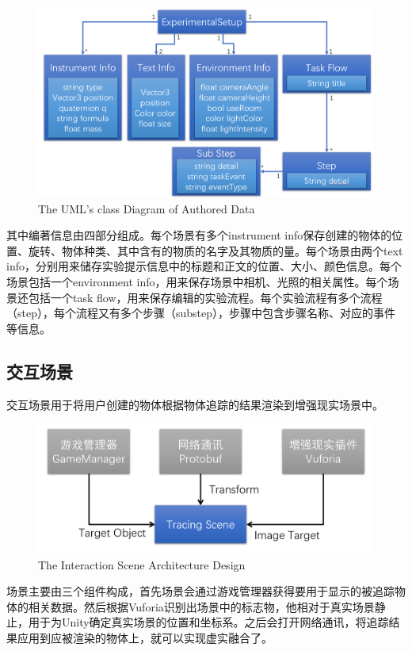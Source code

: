 \begin{figure}[!htp]
  \centering
  \includegraphics[width=12cm]{figure/setupclass.png}
    {The UML's class Diagram of Authored Data}
 \label{fig:uml}
\end{figure}

其中编著信息由四部分组成。每个场景有多个instrument info保存创建的物体的位置、旋转、物体种类、其中含有的物质的名字及其物质的量。每个场景由两个text info，分别用来储存实验提示信息中的标题和正文的位置、大小、颜色信息。每个场景包括一个environment info，用来保存场景中相机、光照的相关属性。每个场景还包括一个task flow，用来保存编辑的实验流程。每个实验流程有多个流程（step），每个流程又有多个步骤（substep），步骤中包含步骤名称、对应的事件等信息。

\subsection{交互场景}
交互场景用于将用户创建的物体根据物体追踪的结果渲染到增强现实场景中。

\begin{figure}[!htp]
  \centering
  \includegraphics[width=12cm]{figure/tracingScene.png}
    {The Interaction Scene Architecture Design}
 \label{fig:int}
\end{figure}

场景主要由三个组件构成，首先场景会通过游戏管理器获得要用于显示的被追踪物体的相关数据。然后根据Vuforia识别出场景中的标志物，他相对于真实场景静止，用于为Unity确定真实场景的位置和坐标系。之后会打开网络通讯，将追踪结果应用到应被渲染的物体上，就可以实现虚实融合了。


